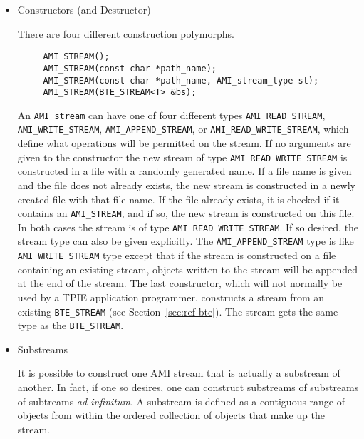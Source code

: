 \begin{itemize}
\item{Constructors (and Destructor)}

There are four different construction polymorphs.

\begin{verbatim}
     AMI_STREAM();
     AMI_STREAM(const char *path_name);
     AMI_STREAM(const char *path_name, AMI_stream_type st);
     AMI_STREAM(BTE_STREAM<T> &bs);
\end{verbatim}

An \verb|AMI_stream| can have one of four different types
\verb|AMI_READ_STREAM|, \verb|AMI_WRITE_STREAM|, \verb|AMI_APPEND_STREAM|,
or \verb|AMI_READ_WRITE_STREAM|, which define what operations will be
permitted on the stream. If
no arguments are given to the constructor the new stream of type
\verb|AMI_READ_WRITE_STREAM| is constructed in a file with a randomly
generated name. If a file name is given and the file does not already
exists, the new stream is constructed in a newly created file with that
file name. If the file already exists, it is checked if it contains an
\verb|AMI_STREAM|, and if so, the new stream is constructed on this
file. In both cases the stream is of type \verb|AMI_READ_WRITE_STREAM|. If
so desired, the stream type can also be given explicitly. The
\verb|AMI_APPEND_STREAM| type is like \verb|AMI_WRITE_STREAM|
type except that if the stream is constructed on
a file containing an existing stream, objects written to the stream will be
appended at the end of the stream. The last constructor, which will not
normally be used by a TPIE application programmer, constructs a stream from an existing \verb|BTE_STREAM| (see
Section~\ref{sec:ref-bte}). The stream gets the same type as the
\verb|BTE_STREAM|.


\item{Substreams}

It is possible to construct one AMI stream that is actually a
substream of another.  In fact, if one so desires, one can construct
substreams of substreams of subtreams {\em ad infinitum}.  A substream
is defined as a contiguous range of objects from within the ordered
collection of objects that make up the stream.


\end{itemize}
